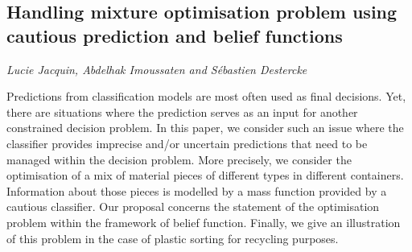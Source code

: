 \documentclass[../booklet.tex]{subfiles}
\begin{document}
\subsection[Handling mixture optimisation problem using cautious prediction and belief functions. {\it Lucie Jacquin, Abdelhak Imoussaten and Sébastien Destercke}]{Handling mixture optimisation problem using cautious prediction and belief functions}
  

\begin{center}
  {\it Lucie Jacquin, Abdelhak Imoussaten and Sébastien Destercke}
\end{center}




Predictions from classification models are most often used as final decisions. Yet, there are situations where the prediction serves as an input for another constrained decision problem. In this paper, we consider such an issue where the classifier provides imprecise and/or uncertain predictions that need to be managed within the decision problem. More precisely, we consider the optimisation of a mix of material pieces of different types in different containers. Information about those pieces is modelled by a mass function provided by a cautious classifier. Our proposal concerns the statement of the optimisation problem within the framework of belief function. Finally, we give an illustration of this problem in the case of plastic sorting for recycling purposes.

\end{document}
